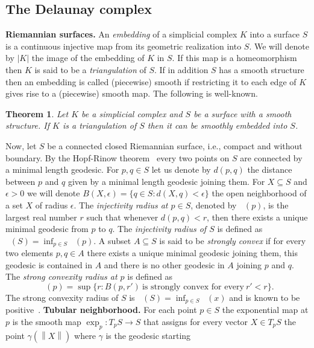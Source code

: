 \documentclass[11pt]{article}
\newtheorem{theorem}{Theorem}
\numberwithin{claimcounter}{theorem}
\theoremstyle{remark}
\theoremstyle{definition}
\numberwithin{theorem}{section}
\newcommand{\norm}[1]{\left\|#1\right\|} %
\DeclareMathOperator{\rinj}{r_{inj}}
\DeclareMathOperator{\rscv}{r_{scv}}
\begin{document}
\subsection{The Delaunay complex}
\noindent
{\bf Riemannian surfaces.}
An \emph{embedding} of a simplicial complex $K$ into a surface $S$ is a continuous injective map from its geometric realization into $S$. We will denote by $|K|$ the image of the embedding of $K$ in $S$. If this map is a homeomorphism then $K$ is said to be a \emph{triangulation} of $S$. If in addition $S$ has a smooth structure then an embedding is called (piecewise) smooth if restricting it to each edge of $K$ gives rise to a (piecewise) smooth map.
The following is well-known.
\begin{theorem}{\cite{hatcher13-triangsurf}}
\label{t:smooth-emb}
Let $K$ be a simplicial complex and $S$ be a surface with a smooth structure. If $K$ is a triangulation of $S$ then it can be smoothly embedded into $S$.
\end{theorem}
%
Now, let $S$ be a connected closed Riemannian surface, i.e., compact and without boundary. By the Hopf-Rinow theorem~\cite{docarmo92-riemannian} every two points on $S$ are connected by a minimal length geodesic. For $p,q\in S$ let us denote by $d(p,q)$ the distance between $p$ and $q$ given by a minimal length geodesic joining them.
For $X\subseteq S$ and $\epsilon >0$ we will denote $B(X,\epsilon) = \{q\in S \colon d(X,q)<\epsilon \}$ the open neighborhood of a set $X$ of radius $\epsilon$.
The \emph{injectivity radius at $p\in S$}, denoted by $\rinj(p)$,
is the largest real number $r$ such that whenever $d(p,q)<r$, then there exists
a unique minimal geodesic from $p$ to $q$. The \emph{injectivity radius of $S$} is defined as $\rinj(S) = \inf_{p\in S} \rinj(p)$.
A subset $A\subseteq S$ is said to be \emph{strongly convex} if for every two elements $p,q\in A$ there exists a unique minimal geodesic joining them, this geodesic is contained in $A$ and there is no other geodesic in $A$ joining $p$ and $q$. 
The \emph{strong convexity radius at $p$} is defined as $$\rscv(p) = \sup \{r \colon B(p,r')~\text{is strongly convex for every}~r' < r \}.$$
The strong convexity radius of $S$ is $\rscv(S) = \inf_{p\in S}\rscv(x)$ and is known to be positive~\cite[1.9.9]{klingenberg95-riemannian}.
%
\vspace{3mm}
\noindent
{\bf Tubular neighborhood.} For each point $p\in S$ the exponential map at $p$ is the smooth map $\exp_p\colon T_pS \rightarrow S$
that assigns for every vector $X\in T_pS$ the point $\gamma(\norm{X})$ where $\gamma$ is the geodesic starting
\end{document}
